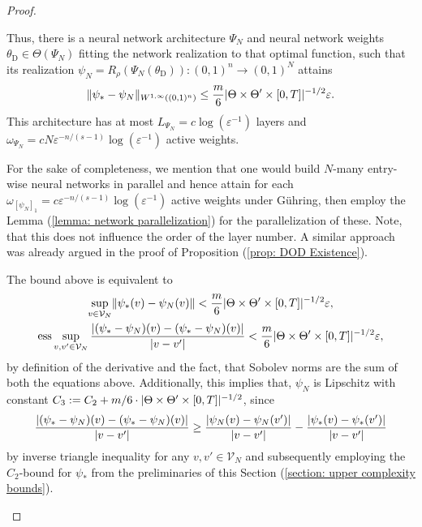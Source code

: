\begin{proof}
\begin{enumerate}
        Thus, 
        there is a neural network architecture $\Psi_N$ and neural network weights $\theta_\text{D} \in \Theta(\Psi_N)$
        fitting the network realization to that optimal function, such that its realization
        $\psi_N = R_\rho(\Psi_N(\theta_\text{D})) : (0, 1)^n \to (0, 1)^N$ attains
        \begin{equation*}
            \lVert \psi_* - \psi_N \rVert_{W^{1, \infty}((0,1)^n)} \leq \frac{m}{6} 
            \lvert \Theta \times \Theta' \times [0, T] \rvert^{-1/2} \varepsilon.
        \end{equation*}
        This architecture has at most $L_{\Psi_N} = c \log(\varepsilon^{-1})$ layers and $\omega_{\Psi_N} = c N 
        \varepsilon^{-n/(s-1)} \log(\varepsilon^{-1})$ active weights. 
        
        For the sake of completeness, we mention that
        one would build $N$-many entry-wise neural networks in parallel and hence attain for each $\omega_{[\psi_N]_1}
        = c \varepsilon^{-n/(s-1)} \log(\varepsilon^{-1})$ active weights under Gühring, then employ the Lemma
        (\ref{lemma: network parallelization}) for the parallelization of these. Note, that this 
        does not influence the order of the layer number. A similar approach 
        was already argued in the proof of Proposition (\ref{prop: DOD Existence}).

        The bound above is equivalent to
        \begin{gather} \label{eq: decoder error for pod-dl-rom}
            \sup\limits_{v \in \mathcal{V}_N} \lVert \psi_*(v) - \psi_N(v) \rVert 
            < \frac{m}{6} \lvert \Theta \times \Theta' \times [0, T] \rvert^{-1/2} \varepsilon, \\
            \operatorname{ess} \sup\limits_{v, v' \in \mathcal{V}_N} 
            \frac{\lvert (\psi_* - \psi_N)(v) - (\psi_* - \psi_N)(v) \rvert}{\lvert v - v' \rvert} 
            < \frac{m}{6} \lvert \Theta \times \Theta' \times [0, T] \rvert^{-1/2} \varepsilon,
        \end{gather}
        by definition of the derivative and the fact, that Sobolev norms are the sum of both the equations above.
        Additionally, this implies that, $\psi_N$ is Lipschitz with constant $C_3 := C_2 + m/6 \cdot 
        \lvert \Theta \times \Theta' \times [0, T] \rvert^{-1/2}$, since
        \begin{equation*}
            \frac{\lvert (\psi_* - \psi_N)(v) - (\psi_* - \psi_N)(v) \rvert}{\lvert v - v' \rvert} \geq 
            \frac{\lvert \psi_N(v) - \psi_N(v') \rvert}{\lvert v - v' \rvert} - \frac{\lvert \psi_*(v) - \psi_*(v') \rvert}{\lvert v - v' \rvert}
        \end{equation*}
        by inverse triangle inequality for any $v, v' \in \mathcal{V}_N$ and subsequently employing the $C_2$-bound for
        $\psi_*$ from the preliminaries of this Section (\ref{section: upper complexity bounds}).



\end{enumerate}
\end{proof}
